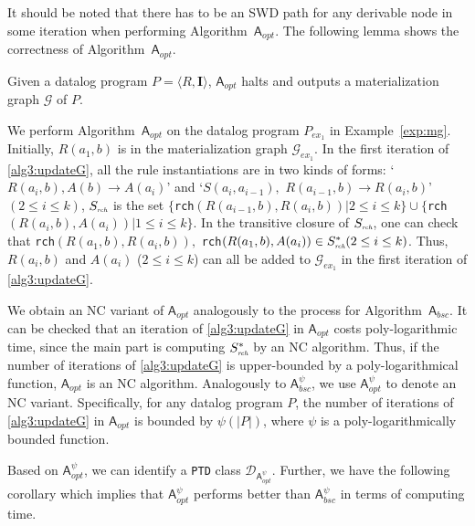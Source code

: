 \documentclass[final,1p,times]{elsarticle}
\begin{document}
It should be noted that there has to be an SWD path for any derivable node in some iteration when performing
Algorithm~$\mathsf{A}_{opt}$.
The following lemma shows the correctness of Algorithm~$\mathsf{A}_{opt}$.

\begin{lemma}\label{lemma:a3}
Given a datalog program $P=\langle R, \textbf{I}\rangle$,
$\mathsf{A}_{opt}$ halts and outputs a materialization graph $\mathcal{G}$ of $P$.
\end{lemma}

\begin{example}\label{exp:opt}
We perform Algorithm~$\mathsf{A}_{opt}$ on the datalog program $P_{ex_1}$ in Example~\ref{exp:mg}.
Initially, $R(a_1,b)$ is in the materialization graph $\mathcal{G}_{ex_1}$.
In the first iteration of \ref{alg3:updateG}, all the rule instantiations are in two kinds of forms:
`$R(a_i,b),A(b)\rightarrow A(a_i)$' and `$S(a_i,a_{i-1}),$ $R(a_{i-1},b)\rightarrow R(a_i,b)$' $(2\leq i\leq k)$,
$S_{\textit{\tiny rch}}$ is the set $\{$\texttt{rch}$(R(a_{i-1},b), R(a_i,b))|2\leq i\leq k\}
\cup\{$\texttt{rch}$(R(a_i,b), A(a_i))|1\leq i\leq k\}$.
In the transitive closure of $S_{\textit{\tiny rch}}$,
one can check that \texttt{rch}$(R(a_1,b), R(a_i,b)),$
\texttt{rch}$(R(a_1,b), A(a_i))\in S^*_{\textit{\tiny rch}}(2\leq i\leq k)$.
Thus, $R(a_i,b)$ and $A(a_i)$ ($2\leq i\leq k$) can all be added to $\mathcal{G}_{ex_1}$
in the first iteration of \ref{alg3:updateG}.
\end{example}

We obtain an NC variant of $\mathsf{A}_{opt}$ analogously to the process for Algorithm~$\mathsf{A}_{bsc}$.
It can be checked that an iteration of \ref{alg3:updateG} in $\mathsf{A}_{opt}$ costs poly-logarithmic
time, since the main part is computing $S^*_{\textit{\tiny rch}}$ by an NC algorithm.
Thus, if the number of iterations of \ref{alg3:updateG} is upper-bounded by a poly-logarithmical function,
$\mathsf{A}_{opt}$ is an NC algorithm.
Analogously to $\mathsf{A}_{bsc}^{\psi}$, we use $\mathsf{A}_{opt}^{\psi}$ to denote an NC variant.
Specifically, for any datalog program $P$, the number of iterations of \ref{alg3:updateG} in $\mathsf{A}_{opt}$
is bounded by $\psi(|P|)$, where $\psi$ is a poly-logarithmically bounded function.

Based on $\mathsf{A}_{opt}^{\psi}$, we can identify a \texttt{PTD} class $\mathcal{D}_{\mathsf{A}_{opt}^{\psi}}$.
Further, we have the following corollary which implies that $\mathsf{A}_{opt}^{\psi}$ performs better
than $\mathsf{A}_{bsc}^{\psi}$ in terms of computing time.
\end{document}
